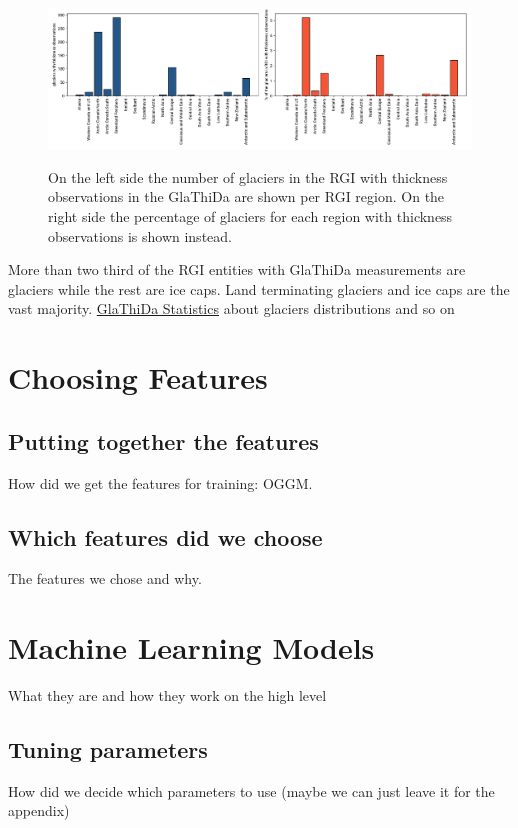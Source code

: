 \begin{figure}[!tp]
	\centering		  
	\includegraphics[width=1.\textwidth]{figures/Observations_per_region.pdf}
	\label{fig:glareg}
	\caption{On the left side the number of glaciers in the RGI with thickness observations in the GlaThiDa are shown per RGI region. On the right side the percentage of glaciers for each region with thickness observations is shown instead.}
\end{figure}

More than two third of the RGI entities with GlaThiDa measurements are glaciers while the rest are ice caps. Land terminating glaciers and ice caps are the vast majority.
\href{https://oggm.org/2019/03/21/GlaThiDa-statistics/}{GlaThiDa Statistics} about glaciers distributions and so on 


\section{Choosing Features}\label{features}

\subsection{Putting together the features}
How did we get the features for training: OGGM.

\subsection{Which features did we choose}
The features we chose and why.

\section{Machine Learning Models}\label{ML}
What they are and how they work on the high level

\subsection{Tuning parameters}
How did we decide which parameters to use (maybe we can just leave it for the appendix)

